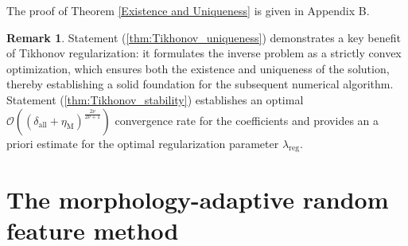 \documentclass{article}
\theoremstyle{plain}
\theoremstyle{definition}
\newtheorem{remark}{\textbf{Remark}}
\begin{document}
The proof of Theorem \ref{Existence and Uniqueness} is given in Appendix B.
\begin{remark}
     Statement (\ref{thm:Tikhonov_uniqueness}) demonstrates a key benefit of Tikhonov regularization: it formulates the inverse problem as a strictly convex optimization, which ensures both the existence and uniqueness of the solution, thereby establishing a solid foundation for the subsequent numerical algorithm. 
      Statement (\ref{thm:Tikhonov_stability}) establishes an optimal $\mathcal{O}((\delta_{\text{all}}+\eta_\text{M})^{\frac{2\nu}{2\nu+1}})$ convergence rate for the coefficients and provides an a priori estimate for the optimal regularization parameter $\lambda_{\text{reg}}$.
\end{remark}



\section{The morphology-adaptive random feature method}
\end{document}
